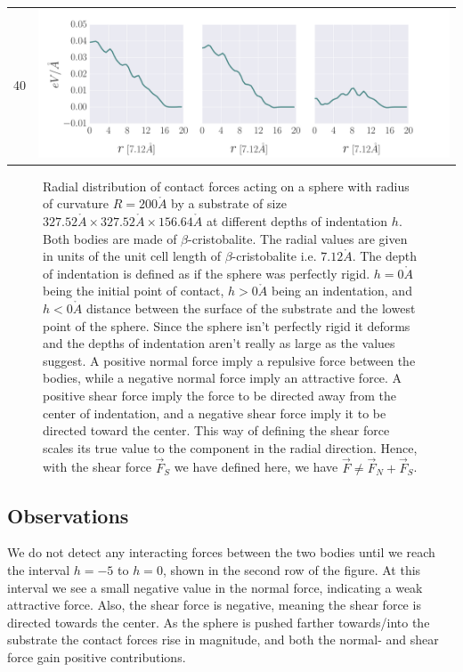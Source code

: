\documentclass[twoside,english]{uiofysmaster}
\begin{document}
\begin{table}[H]
\begin{tabular}{cr}
		40 & \parbox[c]{0.83\linewidth}{
			\includegraphics[width=\linewidth, trim={8mm 0 35mm 3mm}, clip]{../SiO2/xOneEighty/lower/5000/pythonScripts/timeSteps/radialOnly/timestep110000_bottom.pdf}
		}\\
		
	\end{tabular}
\end{table}
\begin{figure}[H]
	\caption{Radial distribution of contact forces acting on a sphere with radius of curvature $R=200\mathring{A}$ by a substrate of size $327.52\mathring{A} \times 327.52\mathring{A} \times 156.64\mathring{A}$ at different depths of indentation $h$. 
		Both bodies are made of $\beta$-cristobalite.
		The radial values are given in units of the unit cell length of $\beta$-cristobalite i.e. $7.12\mathring{A}$. 
		The depth of indentation is defined as if the sphere was perfectly rigid. 
		$h=0\mathring{A}$ being the initial point of contact, $h>0\mathring{A}$ being an indentation, and $h<0\mathring{A}$ distance between the surface of the substrate and the lowest point of the sphere. 
		Since the sphere isn't perfectly rigid it deforms and the depths of indentation aren't really as large as the values suggest. 	 		
		A positive normal force imply a repulsive force between the bodies, while a negative normal force imply an attractive force. 
		A positive shear force imply the force to be directed away from the center of indentation, and a negative shear force imply it to be directed toward the center. 
		This way of defining the shear force scales its true value to the component in the radial direction.
		Hence, with the shear force $\vec{F}_S$ we have defined here, we have $\vec{F} \neq \vec{F}_N + \vec{F}_S$.
}
\label{fig:resultsRadialForceDistributions}
\end{figure}

\subsection{Observations}
 We do not detect any interacting forces between the two bodies until we reach the interval $h=-5$ to $h=0$, shown in the second row of the figure. 
 At this interval we see a small negative value in the normal force, indicating a weak attractive force. 
 Also, the shear force is negative, meaning the shear force is directed towards the center. 
 As the sphere is pushed farther towards/into the substrate the contact forces rise in magnitude, and both the normal- and shear force gain positive contributions. 
 
\end{document}
